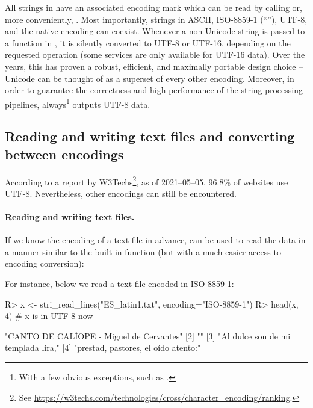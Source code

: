 \documentclass[nojss]{jss}
\begin{document}
All strings in  have an associated encoding mark
which can be read by calling  or, more conveniently,
.
Most importantly, strings in ASCII, ISO-8859-1 (``''),
UTF-8, and the native encoding can coexist.
Whenever a non-Unicode string is passed to a function in ,
it is silently converted to UTF-8 or UTF-16, depending on the requested
operation (some  services are only available for {UTF-16} data).
Over the years, this has proven a robust, efficient, and maximally portable
design choice -- Unicode can be thought of as a superset of every other encoding.
Moreover, in order to guarantee the correctness and high performance of
the string processing pipelines,  always\footnote{With a few
obvious exceptions, such as .} outputs
UTF-8 data.


\subsection{Reading and writing text files and converting between encodings}\label{Sec:read_lines}

According to a report by W3Techs\footnote{See
\url{https://w3techs.com/technologies/cross/character_encoding/ranking}.},
as of 2021--05--05, 96.8\% of websites use UTF-8.
Nevertheless, other encodings can still be encountered.

\paragraph{Reading and writing text files.}
If we know the encoding of a text file  in advance,
 can be used to read
the data in a manner similar to the built-in  function
(but with a much easier access to encoding conversion):

For instance, below we read a text file encoded in ISO-8859-1:

\begin{Schunk}
\begin{Sinput}
R> x <- stri_read_lines("ES_latin1.txt", encoding="ISO-8859-1")
R> head(x, 4)  # x is in UTF-8 now
\end{Sinput}
\begin{Soutput}
[1] "CANTO DE CALÍOPE - Miguel de Cervantes"
[2] ""
[3] "Al dulce son de mi templada lira,"
[4] "prestad, pastores, el oído atento:"
\end{Soutput}
\end{Schunk}
\end{document}
